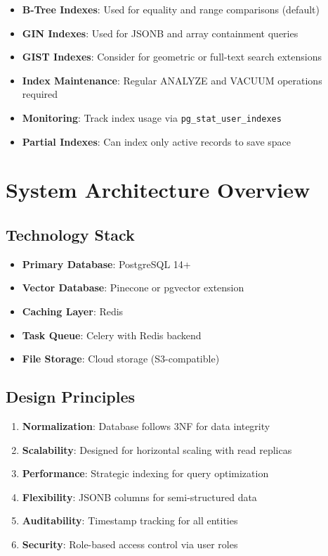 \documentclass[12pt,a4paper]{report}
\begin{document}
\begin{itemize}
    \item \textbf{B-Tree Indexes}: Used for equality and range comparisons (default)
    \item \textbf{GIN Indexes}: Used for JSONB and array containment queries
    \item \textbf{GIST Indexes}: Consider for geometric or full-text search extensions
    \item \textbf{Index Maintenance}: Regular ANALYZE and VACUUM operations required
    \item \textbf{Monitoring}: Track index usage via \texttt{pg\_stat\_user\_indexes}
    \item \textbf{Partial Indexes}: Can index only active records to save space
\end{itemize}

\newpage

\chapter{System Architecture Overview}

\section{Technology Stack}

\begin{itemize}
    \item \textbf{Primary Database}: PostgreSQL 14+
    \item \textbf{Vector Database}: Pinecone or pgvector extension
    \item \textbf{Caching Layer}: Redis
    \item \textbf{Task Queue}: Celery with Redis backend
    \item \textbf{File Storage}: Cloud storage (S3-compatible)
\end{itemize}

\section{Design Principles}

\begin{enumerate}
    \item \textbf{Normalization}: Database follows 3NF for data integrity
    \item \textbf{Scalability}: Designed for horizontal scaling with read replicas
    \item \textbf{Performance}: Strategic indexing for query optimization
    \item \textbf{Flexibility}: JSONB columns for semi-structured data
    \item \textbf{Auditability}: Timestamp tracking for all entities
    \item \textbf{Security}: Role-based access control via user roles
\end{enumerate}
\end{document}
